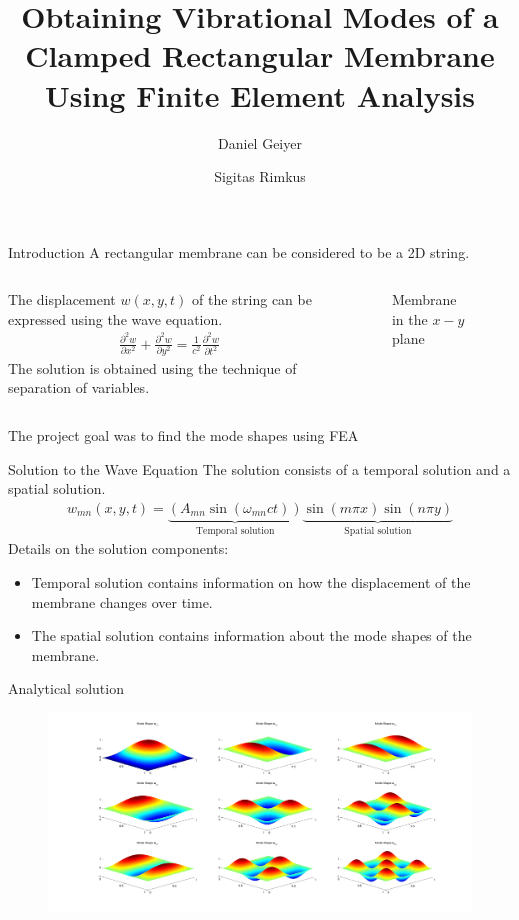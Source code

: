 \documentclass{beamer}
\title{Obtaining Vibrational Modes of a Clamped Rectangular Membrane Using Finite Element Analysis}
\author{Daniel Geiyer \and Sigitas Rimkus}
\begin{document}
	\begin{frame}
		\titlepage
	\end{frame}
	
	\begin{frame}{Introduction}
		A rectangular membrane can be considered to be a 2D string.
		\begin{columns}
			\begin{column}{0.5\textwidth}
				The displacement $w(x,y,t)$ of the string can be expressed using the wave equation.
				\begin{align*}
					\frac{\partial^2w}{\partial x^2}+\frac{\partial^2w}{\partial y^2}=\frac{1}{c^2}\frac{\partial^2w}{\partial t^2}
				\end{align*}
				The solution is obtained using the technique of separation of variables.
			\end{column}
			\begin{column}{0.5\textwidth}
				\begin{figure}
					\centering
					\resizebox{\textwidth}{!}{}
					\caption{Membrane in the $x-y$ plane}
				\end{figure}
			\end{column}
		\end{columns}
		The project goal was to find the mode shapes using FEA
	\end{frame}
	
	\begin{frame}{Solution to the Wave Equation}
		The solution consists of a temporal solution and a spatial solution.
		\begin{align*}
			w_{mn}(x,y,t)=\underbrace{\left(A_{mn}\sin\left(\omega_{mn}ct\right)\right)}_\text{Temporal solution}\underbrace{\sin \left(m\pi x\right)\sin \left(n\pi y\right)}_\text{Spatial solution}
		\end{align*}
		Details on the solution components:
		\begin{itemize}
			\item{Temporal solution contains information on how the displacement of the membrane changes over time.}
			\item{The spatial solution contains information about the mode shapes of the membrane.}
		\end{itemize}
	\end{frame}
	
	\begin{frame}{Analytical solution}
		\begin{figure}
			\centering
			\includegraphics[width=\textwidth]{modes_surf}
		\end{figure}
	\end{frame}
\end{document}
